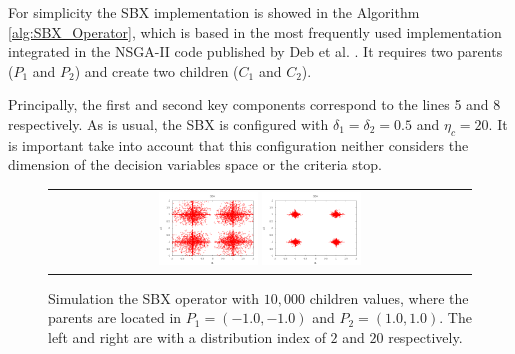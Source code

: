 %
For simplicity the SBX implementation is showed in the Algorithm \ref{alg:SBX_Operator}, which is based in the most frequently used implementation integrated in the NSGA-II code published by Deb et al. \cite{Joel:NSGAII}.
%
It requires two parents ($P_1$ and $P_2$) and create two children ($C_1$ and $C_2$).
%

Principally, the first and second key components correspond to the lines 5 and 8 respectively. 
%
As is usual, the SBX is configured with $\delta_1 = \delta_2 = 0.5$ and $\eta_c = 20$.
%
It is important take into account that this configuration neither considers the dimension of the decision variables space or the criteria stop.

\begin{figure}[t]
\centering
\begin{tabular}{c}
   \includegraphics[width=0.24\textwidth]{img/SBX_eta_2.png}  %
   \includegraphics[width=0.24\textwidth]{img/SBX_eta_20.png} 
\end{tabular}
\caption{Simulation the SBX operator with $10,000$ children values, where the parents are located in $P_1=(-1.0, -1.0)$ and $P_2=(1.0, 1.0)$. The left and right are with a distribution index of $2$ and $20$ respectively.}
\label{fig:Simulation_Case_3}
\end{figure}
